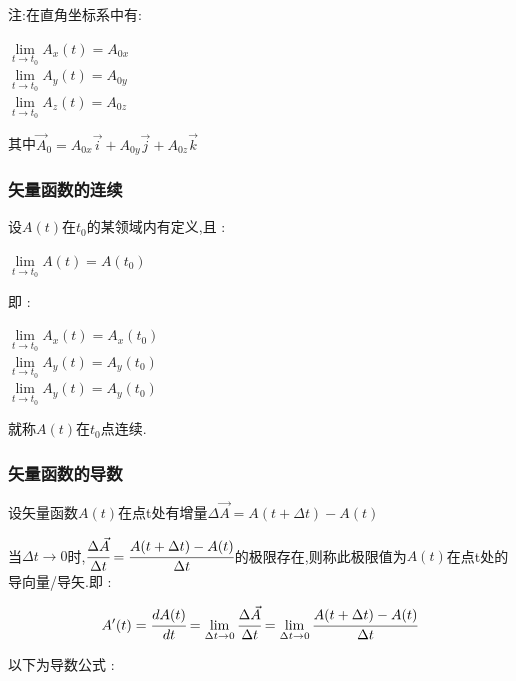 \documentclass[UTF8,12pt]{ctexbook}
\newcommand{\limNormal}[1]{\lim\limits_{#1}}
\newcommand{\derivative}{^\prime}
\begin{document}
{{{{{      注:在直角坐标系中有:

      \begin{center}
        $\limNormal{t \to t_0}A_x(t) = A_{0x}$ \\
        $\limNormal{t \to t_0}A_y(t) = A_{0y}$ \\
        $\limNormal{t \to t_0}A_z(t) = A_{0z}$
      \end{center}

      其中$\vec{A}_0 = A_{0x}\vec{i} + A_{0y}\vec{j} + A_{0z}\vec{k}$
    }%

    \subsubsection{矢量函数的连续}{
      设$A(t)$在$t_0$的某领域内有定义,且 :

      \begin{center}
        $\limNormal{t \to t_0}A(t) = A(t_0)$
      \end{center}

      即 :

      \begin{center}
        $\limNormal{t \to t_0}A_x(t) = A_x(t_0)$ \\
        $\limNormal{t \to t_0}A_y(t) = A_y(t_0)$ \\
        $\limNormal{t \to t_0}A_y(t) = A_y(t_0)$
      \end{center}

      就称$A(t)$在$t_0$点连续.
    }%

    \subsubsection{矢量函数的导数}{
      设矢量函数$A(t)$在点t处有增量$\Delta \vec{A} = A(t + \Delta t) - A(t)$

      当$\Delta t \to 0$时,$\cfrac{\Delta \vec{A}}{\Delta t} = \cfrac{A(t + \Delta t) - A(t)}{\Delta t}$的极限存在,则称此极限值为$A(t)$在点t处的导向量/导矢.即 :

      $$
        A\derivative(t) = \cfrac{dA(t)}{dt} = \limNormal{\Delta t \to 0}\cfrac{\Delta \vec{A}}{\Delta t} = \limNormal{\Delta t \to 0}\cfrac{A(t + \Delta t) - A(t)}{\Delta t}
      $$

      以下为导数公式 :

}}}}}
\end{document}
